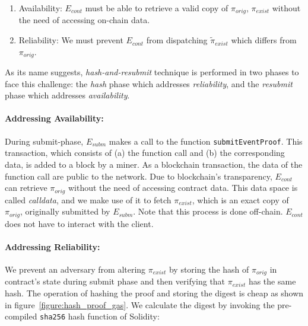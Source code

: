 \begin{enumerate}

    \item Availability: $E_{cont}$ must be able to retrieve a valid copy of $\pi_{orig}$,
        $\pi_{exist}$ without the need of accessing on-chain data.

    \item Reliability: We must prevent $E_{cont}$ from dispatching
        $\tilde\pi_{exist}$ which differs from $\pi_{orig}$.

\end{enumerate}

As its name suggests, \emph{hash-and-resubmit} technique is performed in two
phases to face this challenge: the \emph{hash} phase which addresses
\emph{reliability}, and the \emph{resubmit} phase which addresses
\emph{availability}.


\paragraph{Addressing Availability:}

During submit-phase, $E_{subm}$ makes a call to the function
\texttt{submitEventProof}. This transaction, which consists of (a) the function
call and (b) the corresponding data, is added to a block by a miner. As a
blockchain transaction, the data of the function call are public to the
network. Due to blockchain's transparency, $E_{cont}$ can retrieve
$\pi_{orig}$ without the need of accessing contract data. This data space is
called \emph{calldata}, and we make use of it to fetch $\pi_{exist}$, which is
an exact copy of $\pi_{orig}$, originally submitted by $E_{subm}$. Note that
this process is done off-chain. $E_{cont}$ does not have to interact with the
client.

\paragraph{Addressing Reliability:}

We prevent an adversary from altering $\pi_{exist}$ by storing the hash of
$\pi_{orig}$ in contract's state during submit phase and then verifying that
$\pi_{exist}$ has the same hash. The operation of hashing the proof and storing
the digest is cheap as shown in figure~\ref{figure:hash_proof_gas}. We
calculate the digest by invoking the pre-compiled \texttt{sha256} hash function
of Solidity:

